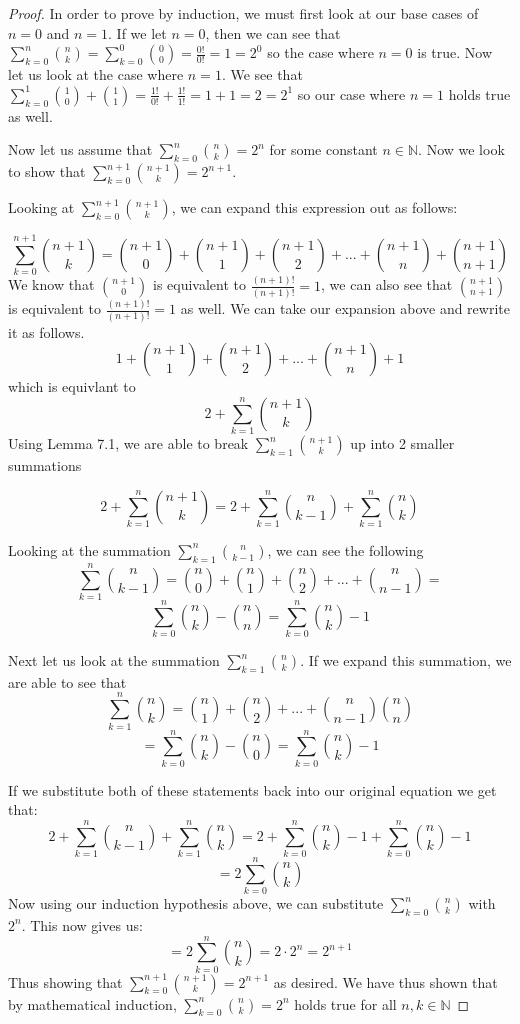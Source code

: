 \begin{proof}
In order to prove by induction, we must first look at our base cases of $n = 0$ and $n = 1$.
If we let $n = 0$, then we can see that $\sum_{k=0}^{n} {n \choose k} = \sum_{k=0}^{0} {0 \choose 0} =\frac{0!}{0!} = 1 = 2^0$ so the case where $n = 0$ is true.
Now let us look at the case where $n = 1$. We see that $\sum_{k=0}^{1} {1 \choose 0}  + {1 \choose 1} = \frac{1!}{0!} + \frac{1!}{1!} = 1 + 1 = 2 = 2^1$ so our case where $n = 1$ holds true as well.

Now let us assume that $\sum_{k=0}^{n} {n \choose k}= 2^n$ for some constant $n \in \mathbb{N}$. Now we look to show that $\sum_{k=0}^{n + 1} {n + 1 \choose k}= 2^{n+1}$.

Looking at $\sum_{k=0}^{n + 1} {n + 1 \choose k}$, we can expand this expression out as follows:

$$ \sum_{k=0}^{n + 1} {n + 1 \choose k} = {n + 1 \choose 0} + {n + 1 \choose 1} + {n + 1 \choose 2} + ... + {n + 1 \choose n} + {n + 1 \choose n + 1}$$
We know that ${n + 1 \choose 0}$ is equivalent to $\frac{(n + 1)!}{(n + 1)!} = 1$, we can also see that ${n + 1 \choose n + 1}$ is equivalent to $\frac{(n + 1)!}{(n + 1)!} = 1$ as well. We can take our expansion above and rewrite it as follows.
$$ 1 + {n + 1 \choose 1} + {n + 1 \choose 2} + ... + {n + 1 \choose n} + 1$$
which is equivlant to 
$$ 2 + \sum_{k=1}^{n} {n + 1 \choose k} $$
Using Lemma 7.1, we are able to break $\sum_{k=1}^{n} {n + 1 \choose k}$ up into 2 smaller summations

$$ 2 + \sum_{k=1}^{n} {n + 1 \choose k}  = 2 + \sum_{k=1}^{n} {n \choose k - 1} + \sum_{k=1}^{n} {n \choose k} $$

Looking at the summation $\sum_{k=1}^{n} {n \choose k - 1}$, we can see the following $$\sum_{k=1}^{n} {n \choose k - 1} = {n  \choose 0} + {n  \choose 1} + {n \choose 2} + ... + {n \choose n - 1} = $$ $$\sum_{k=0}^{n} {n \choose k} - {n \choose n} = \sum_{k=0}^{n} {n \choose k} - 1$$

Next let us look at the summation $\sum_{k=1}^{n} {n \choose k}$. If we expand this summation, we are able to see that $$\sum_{k=1}^{n} {n \choose k} =  {n  \choose 1} + {n \choose 2} + ... + {n \choose n - 1} {n  \choose n}$$
 $$= \sum_{k=0}^{n} {n \choose k} - {n \choose 0} = \sum_{k=0}^{n} {n \choose k} - 1$$
 
 If we substitute both of these statements back into our original equation we get that:
 $$ 2 + \sum_{k=1}^{n} {n \choose k - 1} + \sum_{k=1}^{n} {n \choose k} =  2 + \sum_{k=0}^{n} {n \choose k} - 1 +  \sum_{k=0}^{n} {n \choose k} - 1$$
 $$= 2 \sum_{k=0}^{n} {n \choose k}$$
 Now using our induction hypothesis above, we can substitute $\sum_{k=0}^{n} {n \choose k}$ with $2^n$. This now gives us:
  $$= 2 \sum_{k=0}^{n} {n \choose k} = 2\cdot2^n = 2 ^{n+1}$$ Thus showing that $\sum_{k=0}^{n + 1} {n + 1 \choose k}= 2^{n+1}$ as desired. We have thus shown that by mathematical induction, $\sum_{k=0}^{n} {n \choose k}= 2^n$ holds true for all $n,k\in \mathbb{N}$
  
\end{proof}